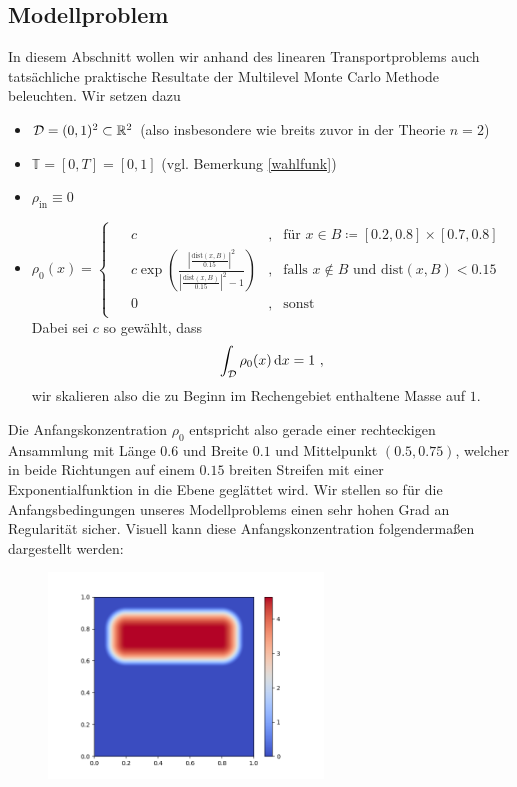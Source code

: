 
\subsection{Modellproblem}

In diesem Abschnitt wollen wir anhand des linearen Transportproblems auch tatsächliche praktische Resultate der Multilevel Monte Carlo Methode beleuchten.
Wir setzen dazu
\begin{itemize}
	\item $ \mathcal{D} = (0,1)^2 \subset \mathbb{R}^2 $ (also insbesondere wie breits zuvor in der Theorie $ n=2 $)
	\item $ \mathbb{T} = [0,T] = [0,1] $ (vgl. Bemerkung \ref{wahlfunk})
	\item $ \rho_{\text{in}} \equiv 0 $
	\item $ \rho_0(x) = 
	\begin{cases*}
		\begin{array}{llll}
			&c & , &\text{für }x \in B \coloneqq [0.2,0.8] \times [0.7 ,0.8]  \\
			&c\exp \left(\frac{ \left| \frac{\text{dist}(x,B)}{0.15} \right| ^2}{\left|\frac{\text{dist}(x,B)}{0.15}\right|^2-1}\right) &, &\text{falls } x \not \in B \text{ und dist}(x,B) < 0.15 \\
			&0 &, & \text{sonst}
		\end{array}
	\end{cases*}$ \\
	Dabei sei $ c $ so gewählt, dass 
	\[
		\int_{\mathcal{D}} \rho_0(x) \, \mathrm{d} x = 1 \ ,
	\]
	wir skalieren also die zu Beginn im Rechengebiet enthaltene Masse auf $ 1 $.
\end{itemize} 
Die Anfangskonzentration $ \rho_0 $ entspricht also gerade einer rechteckigen Ansammlung mit Länge $ 0.6$ und Breite $ 0.1$ und Mittelpunkt $ (0.5,0.75) $, welcher in beide Richtungen auf einem $ 0.15$ breiten Streifen mit einer Exponentialfunktion in die Ebene geglättet wird. 
Wir stellen so für die Anfangsbedingungen unseres Modellproblems einen sehr hohen Grad an Regularität sicher. 
Visuell kann diese Anfangskonzentration folgendermaßen dargestellt werden:
\begin{figure}[H]
	\centering
	\includegraphics[width=0.65\textwidth]{plots/anfangsbedingung.png} 
\end{figure}
